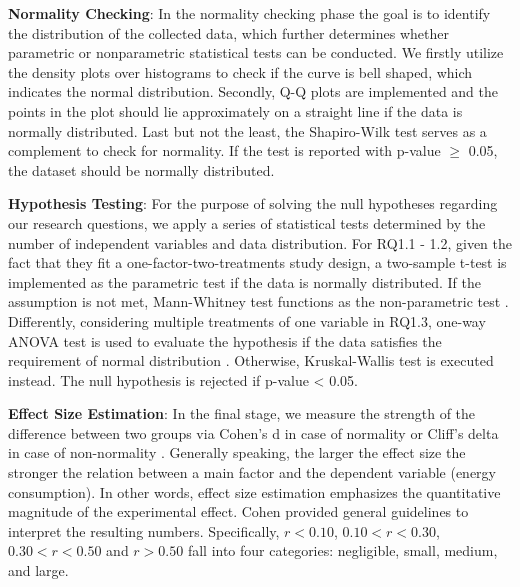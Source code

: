 	\textbf{Normality Checking}: In the normality checking phase the goal is to identify the distribution of the collected data, which further determines whether parametric or nonparametric statistical tests can be conducted. We firstly utilize the density plots over histograms to check if the curve is bell shaped, which indicates the normal distribution. Secondly, Q-Q plots are implemented and the points in the plot should lie approximately on a straight line if the data is normally distributed. Last but not the least, the Shapiro-Wilk test serves as a complement to check for normality. If the test is reported with p-value $\ge$ 0.05, the dataset should be normally distributed. 
	
	\textbf{Hypothesis Testing}: For the purpose of solving the null hypotheses regarding our research questions, we apply a series of statistical tests determined by the number of independent variables and data distribution. For RQ1.1 - 1.2, given the fact that they fit a one-factor-two-treatments study design, a two-sample t-test is implemented as the parametric test if the data is normally distributed. If the assumption is not met, Mann-Whitney test functions as the non-parametric test \cite{Fay2010Wilcoxon}.
	Differently, considering multiple treatments of one variable in RQ1.3, one-way ANOVA test is used to evaluate the hypothesis if the data satisfies the requirement of normal distribution \cite{Hecke2012Power}. Otherwise, Kruskal-Wallis test is executed instead. The null hypothesis is rejected if p-value < 0.05. 
	
	\textbf{Effect Size Estimation}: In the final stage, we measure the strength of the difference between two groups via Cohen’s d in case of normality or Cliff’s delta in case of non-normality \cite{macbeth2011cliff}. Generally speaking, the larger the effect size the stronger the relation between a main factor and the dependent variable (\ie energy consumption). In other words, effect size estimation emphasizes the quantitative magnitude of the experimental effect. Cohen \cite{cohen2013statistical} provided general guidelines to interpret the resulting numbers. Specifically, $r<0.10$, $0.10<r<0.30$, $0.30<r<0.50$ and $r>0.50$ fall into four categories: negligible, small, medium, and large. 

